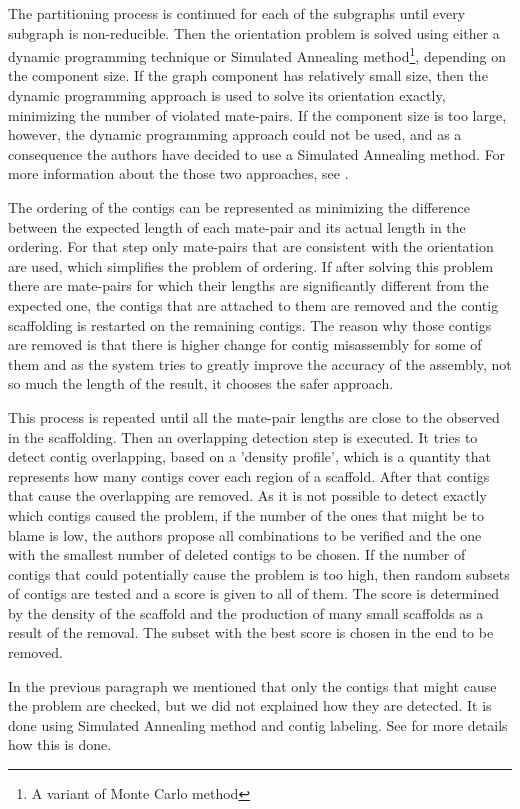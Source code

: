 \documentclass[11pt]{article}
\begin{document}
The partitioning process is continued for each of the subgraphs until every
subgraph is non-reducible. Then the orientation problem is solved using either a
dynamic programming technique or Simulated Annealing method\footnote{A variant
of Monte Carlo method}, depending on the component size. If the graph component
has relatively small size, then the dynamic programming approach is used to
solve its orientation exactly, minimizing the number of violated mate-pairs. If
the component size is too large, however, the dynamic programming approach could
not be used, and as a consequence the authors have decided to use a Simulated
Annealing method. For more information about the those two approaches, see
\cite{SOPRA}.

The ordering of the contigs can be represented as minimizing the difference
between the expected length of each mate-pair and its actual length in the
ordering. For that step only mate-pairs that are consistent with the orientation
are used, which simplifies the problem of ordering. If after solving this
problem there are mate-pairs for which their lengths are significantly different
from the expected one, the contigs that are attached to them are removed and the
contig scaffolding is restarted on the remaining contigs. The reason why those
contigs are removed is that there is higher change for contig misassembly for
some of them and as the system tries to greatly improve the accuracy of the
assembly, not so much the length of the result, it chooses the safer approach.

This process is repeated until all the mate-pair lengths are close to the
observed in the scaffolding. Then an overlapping detection step is executed. It
tries to detect contig overlapping, based on a 'density profile', which is a
quantity that represents how many contigs cover each region of a scaffold. After
that contigs that cause the overlapping are removed. As it is not possible to
detect exactly which contigs caused the problem, if the number of the ones that
might be to blame is low, the authors propose all combinations to be verified
and the one with the smallest number of deleted contigs to be chosen. If the
number of contigs that could potentially cause the problem is too high, then
random subsets of contigs are tested and a score is given to all of them. The
score is determined by the density of the scaffold and the production of many
small scaffolds as a result of the removal. The subset with the best score is
chosen in the end to be removed.

In the previous paragraph we mentioned that only the contigs that might cause
the problem are checked, but we did not explained how they are detected. It is
done using Simulated Annealing method and contig labeling. See \cite{SOPRA} for
more details how this is done.
\end{document}
